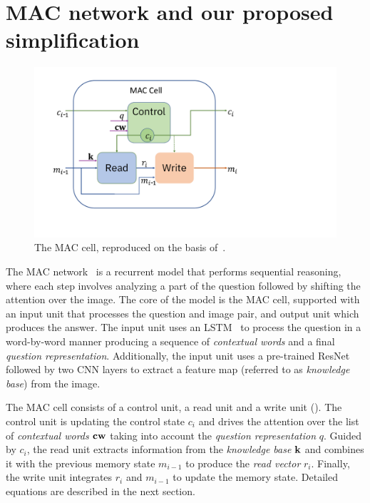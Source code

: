 \section{MAC network and our proposed simplification}

\begin{figure}
	\vspace{-15pt}
	\centering
	\includegraphics[width=\textwidth]{../img/mac_cell.pdf}
	\caption{The MAC cell, reproduced on the basis of~\cite{hudson2018compositional}.}
	\label{fig:mac_cell}
	\vspace{-5pt}
\end{figure}

The MAC network~\cite{hudson2018compositional} is a recurrent model that performs sequential reasoning, where each step involves analyzing a part of the question followed by shifting the attention over the image.
The core of the model is the MAC cell, supported with an input unit that processes the question and image pair, and output unit which produces the answer.
The input unit  uses an LSTM~\cite{hochreiter1997long} to process the question in a word-by-word manner producing a sequence of \emph{contextual words} and a final \emph{question representation}.
Additionally, the input unit uses a pre-trained ResNet~\cite{he2016resnet} followed by two CNN layers to extract a feature map (referred to as \emph{knowledge base}) from the image.

	
The MAC cell consists of a control unit, a read unit and a write unit ().
The control unit is updating the control state $c_i$ and drives the attention over the list of \emph{contextual words} $\mathbf{cw}$ taking into account the \emph{question representation} $q$.
Guided by $c_i$,  the read unit extracts information from the \emph{knowledge base} $\mathbf{k}$ and combines it with the previous memory state $m_{i-1}$  to produce the \emph{read vector} $r_i$.
Finally, the write unit integrates $r_i$ and $m_{i-1}$ to update the memory state. Detailed equations are described in the next section.

